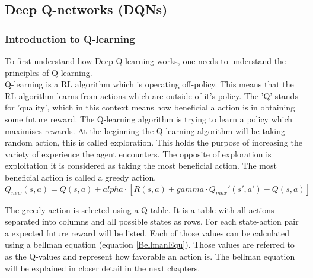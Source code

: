 \documentclass[12pt]{article}
\def\alpha{alpha}%
\def\gamma{gamma}%
\begin{document}
\subsection{Deep Q-networks (DQNs)}
\subsubsection{Introduction to Q-learning}
To first understand how \gls{Deep Q-learning} works, one needs to understand the principles of \gls{Q-learning}.\\
\gls{Q-learning} is a RL algorithm which is operating \gls{off-policy}. This means that the RL algorithm learns from actions which are outside of it's \gls{policy}. The 'Q' stands for 'quality', which in this context means how beneficial a action is in obtaining some future \gls{reward}. The \gls{Q-learning} algorithm is trying to learn a \gls{policy} which maximises \glspl{reward}. At the beginning the \gls{Q-learning} algorithm will be taking random action, this is called \gls{exploration}. This holds the purpose of increasing the variety of \gls{experience} the agent encounters. The opposite of \gls{exploration} is \gls{exploitation} it is considered as taking the most beneficial action. The most beneficial action is called a \gls{greedy action}. \cite{rl_q-learning} \\
\begin{equation}
Q_{new}(s,a) = Q(s, a) + \alpha \cdot [R(s, a) + \gamma \cdot Q_{max}'(s', a') - Q(s, a)]
\label{BellmanEqu}
\end{equation}

The \gls{greedy action} is selected using a \gls{Q-table}. It is a table with all actions separated into columns and all possible \glspl{state} as rows. For each state-action pair a expected future \gls{reward} will be listed. Each of those values can be calculated using a bellman equation (equation \ref{BellmanEqu}). Those values are referred to as the \glspl{Q-value} and represent how favorable an action is. The bellman equation will be explained in closer detail in the next chapters.  \cite{rl_q-table} 
\end{document}
